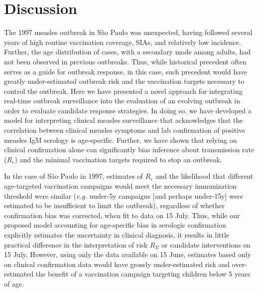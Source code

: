 \section{Discussion}\label{discussion}

The 1997 measles outbreak in S\~{a}o Paulo was unexpected, having followed several years of high routine vaccination coverage, SIAs, and relatively low incidence. Further, the age distribution of cases, with a secondary mode among adults, had not been observed in previous outbreaks. Thus, while historical precedent often serves as a guide for outbreak response, in this case, such precedent would have greatly under-estimated outbreak risk and the vaccination targets necessary to control the outbreak. Here we have presented a novel approach for integrating real-time outbreak surveillance into the evaluation of an evolving outbreak in order to evaluate candidate response strategies. In doing so, we have developed a model for interpreting clinical measles surveillance that acknowledges that the correlation between clinical measles symptoms and lab confirmation of positive measles IgM serology is age-specific. Further, we have shown that relying on clinical confirmation alone can significantly bias inference about transmission rate ($R_e$) and the minimal vaccination targets required to stop an outbreak.

In the case of S\~{a}o Paulo in 1997, estimates of $R_e$ and the likelihood that different age-targeted vaccination campaigns would meet the necessary immunization threshold were similar (\emph{e.g.} under-5y campaigns [and perhaps under-15y] were estimated to be insufficient to limit the outbreak), regardless of whether confirmation bias was corrected, when fit to data on 15 July. Thus, while our proposed model accounting for age-specific bias in serologic confirmation explicitly estimates the uncertainty in clinical diagnosis, it results in little practical difference in the interpretation of risk \(R_E\) or candidate interventions on 15 July. However, using only the data available on 15 June, estimates based only on clinical confirmation data would have grossly under-estimated risk and over-estimated the benefit of a vaccination campaign targeting children below 5 years of age. 


